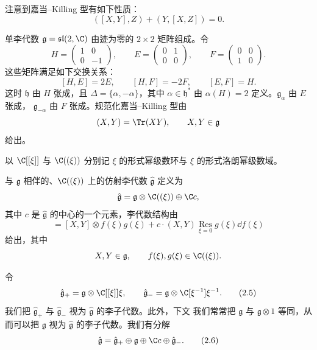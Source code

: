 
注意到嘉当--Killing 型有如下性质：
\begin{equation}
([X,Y],Z)+(Y,[X,Z])=0. \tag{2.3}
\end{equation}

\begin{example}[2.1]
单李代数 $\mathfrak{g}=\mathfrak{sl}(2,\C)$ 由迹为零的 $2\times 2$ 矩阵组成。令
\[
H=\begin{pmatrix}1&0\\0&-1\end{pmatrix},\qquad
E=\begin{pmatrix}0&1\\0&0\end{pmatrix},\qquad
F=\begin{pmatrix}0&0\\1&0\end{pmatrix}.
\]
这些矩阵满足如下交换关系：
\[
[H,E]=2E,\qquad [H,F]=-2F,\qquad [E,F]=H.
\]
这时 $\mathfrak{h}$ 由 $H$ 张成，且 $\Delta=\{\alpha,-\alpha\}$，其中
$\alpha\in\mathfrak{h}^*$ 由 $\alpha(H)=2$ 定义。$\mathfrak{g}_{\alpha}$ 由 $E$ 张成，
$\mathfrak{g}_{-\alpha}$ 由 $F$ 张成。规范化嘉当--Killing 型由
\[
(X,Y)=\Tr(XY),\qquad X,Y\in\mathfrak{g}
\]
给出。
\end{example}

以 $\C[[\xi]]$ 与 $\C((\xi))$ 分别记 $\xi$ 的形式幂级数环与 $\xi$ 的形式洛朗幂级数域。

\begin{definition}[2.2]
与 $\mathfrak{g}$ 相伴的、$\C((\xi))$ 上的仿射李代数 $\hat{\mathfrak{g}}$ 定义为
\[
\hat{\mathfrak{g}}=\mathfrak{g}\otimes\C((\xi))\oplus\C c,
\]
其中 $c$ 是 $\hat{\mathfrak{g}}$ 的中心的一个元素，李代数结构由
\begin{equation}
[X\otimes f(\xi),Y\otimes g(\xi)]=[X,Y]\otimes f(\xi)g(\xi)
+c\cdot(X,Y)\operatorname*{Res}_{\xi=0}g(\xi)\dd f(\xi) \tag{2.4}
\end{equation}
给出，其中
\[
X,Y\in\mathfrak{g},\qquad f(\xi),g(\xi)\in\C((\xi)).
\]
\end{definition}

令
\begin{equation}
\hat{\mathfrak{g}}_+=\mathfrak{g}\otimes\C[[\xi]]\xi,\qquad
\hat{\mathfrak{g}}_-=\mathfrak{g}\otimes\C[\xi^{-1}]\xi^{-1}. \tag{2.5}
\end{equation}
我们把 $\hat{\mathfrak{g}}_+$ 与 $\hat{\mathfrak{g}}_-$ 视为 $\hat{\mathfrak{g}}$ 的李子代数。此外，下文
我们常常把 $\mathfrak{g}$ 与 $\mathfrak{g}\otimes 1$ 等同，从而可以把 $\mathfrak{g}$ 视为
$\hat{\mathfrak{g}}$ 的李子代数。我们有分解
\begin{equation}
\hat{\mathfrak{g}}=\hat{\mathfrak{g}}_+\oplus\mathfrak{g}\oplus\C c\oplus\hat{\mathfrak{g}}_-. \tag{2.6}
\end{equation}

